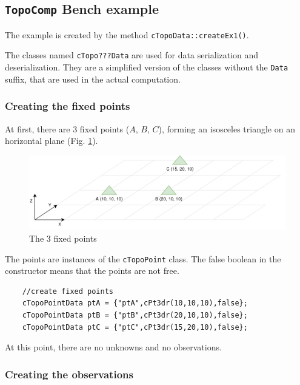  

\subsection{\texttt{TopoComp} Bench example}
\label{subsec:topoBench}

The example is created by the method \texttt{cTopoData::createEx1()}.

The classes named \texttt{cTopo???Data} are used for data serialization and deserialization.
They are a simplified version of the classes without the \texttt{Data} suffix, that are used in
the actual computation.


\subsubsection{Creating the fixed points}

At first, there are 3 fixed points ($A$, $B$, $C$), forming an isosceles triangle
on an horizontal plane (Fig. \ref{fig:topoEx1}).

\begin{figure}[!h]
\centering
\includegraphics[width=12cm]{Programmer/benchtopo1.png}
\caption{The 3 fixed points}
\label{fig:topoEx1}
\end{figure}

The points are instances of the \texttt{cTopoPoint} class.
The false boolean in the constructor means that the points are not free.

\begin{lstlisting}
    //create fixed points
    cTopoPointData ptA = {"ptA",cPt3dr(10,10,10),false};
    cTopoPointData ptB = {"ptB",cPt3dr(20,10,10),false};
    cTopoPointData ptC = {"ptC",cPt3dr(15,20,10),false};
\end{lstlisting}

At this point, there are no unknowns and no observations.


\subsubsection{Creating the observations}

